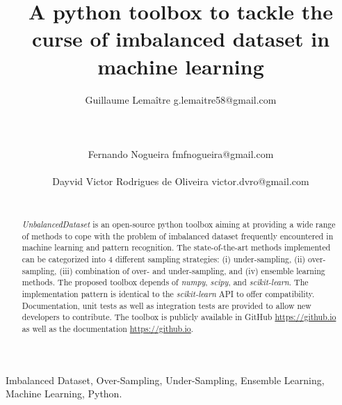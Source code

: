 \documentclass[twoside,11pt]{article}
\begin{document}
\title{A python toolbox to tackle the curse of imbalanced dataset in machine learning}
\author{Guillaume Lema\^itre \email g.lemaitre58@gmail.com \\  \\  \\  \\ 
        \AND
        Fernando Nogueira \email fmfnogueira@gmail.com \\  \\ 
        \AND
        Dayvid Victor Rodrigues de Oliveira \email victor.dvro@gmail.com \\  \\ } 
\editor{-}

\maketitle

\begin{abstract}
\emph{UnbalancedDataset} is an open-source python toolbox aiming at providing a wide range of methods to cope with the problem of imbalanced dataset frequently encountered in machine learning and pattern recognition.
The state-of-the-art methods implemented can be categorized into 4 different sampling strategies: (i) under-sampling, (ii) over-sampling, (iii) combination of over- and under-sampling, and (iv) ensemble learning methods.
The proposed toolbox depends of \emph{numpy}, \emph{scipy}, and \emph{scikit-learn}.
The implementation pattern is identical to the \emph{scikit-learn} API to offer compatibility.
Documentation, unit tests as well as integration tests are provided to allow new developers to contribute.
The toolbox is publicly available in GitHub \url{https://github.io} as well as the documentation \url{https://github.io}.
\end{abstract}

\begin{keywords}
Imbalanced Dataset, Over-Sampling, Under-Sampling, Ensemble Learning, Machine Learning, Python.
\end{keywords}
\end{document}

